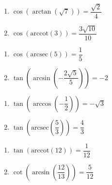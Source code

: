 \documentclass{ximera}
\begin{document}
\begin{multicols}{2}

\begin{enumerate}

\setcounter{enumi}{\value{HW}}

\item  $\cos\left(\arctan\left(\sqrt{7} \right)\right) = \dfrac{\sqrt{2}}{4}$
\item  $\cos\left(\text{arccot}\left( 3 \right)\right) = \dfrac{3\sqrt{10}}{10}$

\setcounter{HW}{\value{enumi}}

\end{enumerate}

\end{multicols}

\begin{multicols}{2}

\begin{enumerate}

\setcounter{enumi}{\value{HW}}

\item  $\cos\left(\text{arcsec}\left( 5 \right)\right) = \dfrac{1}{5}$ 
\item  $\tan\left(\arcsin\left(-\dfrac{2\sqrt{5}}{5}\right)\right)=-2$

\setcounter{HW}{\value{enumi}}

\end{enumerate}

\end{multicols}

\begin{multicols}{2}

\begin{enumerate}

\setcounter{enumi}{\value{HW}}

\item  $\tan\left(\arccos\left(-\dfrac{1}{2}\right)\right) = -\sqrt{3}$
\item  $\tan\left(\text{arcsec}\left(\dfrac{5}{3}\right)\right) = \dfrac{4}{3}$

\setcounter{HW}{\value{enumi}}

\end{enumerate}

\end{multicols}

\begin{multicols}{2}

\begin{enumerate}

\setcounter{enumi}{\value{HW}}

\item  $\tan\left(\text{arccot}\left( 12  \right)\right) = \dfrac{1}{12}$ 
\item  $\cot\left(\arcsin\left(\dfrac{12}{13}\right)\right) = \dfrac{5}{12}$

\setcounter{HW}{\value{enumi}}

\end{enumerate}

\end{multicols}
\end{document}
